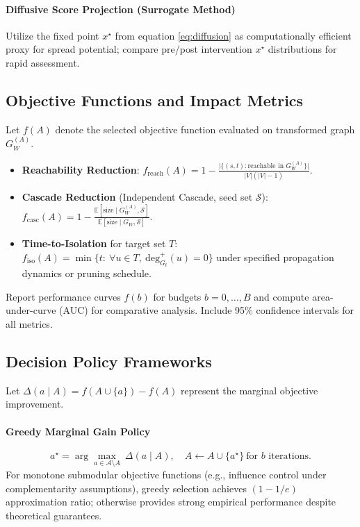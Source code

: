 \documentclass[12pt]{article}
\theoremstyle{plain}
\begin{document}
\paragraph{Diffusive Score Projection (Surrogate Method)}
Utilize the fixed point $x^\star$ from equation \eqref{eq:diffusion} as computationally efficient proxy for spread potential; compare pre/post intervention $x^\star$ distributions for rapid assessment.

\subsection{Objective Functions and Impact Metrics}
Let $f(A)$ denote the selected objective function evaluated on transformed graph $G_W^{(A)}$.
\begin{itemize}\itemsep0.2em
\item \textbf{Reachability Reduction}:
$\displaystyle f_{\text{reach}}(A)=1-\frac{\lvert\{(s,t):\text{reachable in }G_W^{(A)}\}\rvert}{\lvert V\rvert(\lvert V\rvert-1)}.$
\item \textbf{Cascade Reduction} (Independent Cascade, seed set $\mathcal{S}$):
$\displaystyle f_{\text{casc}}(A)=1-\frac{\mathbb{E}[\text{size}\mid G_W^{(A)},\mathcal{S}]}{\mathbb{E}[\text{size}\mid G_W,\mathcal{S}]}.$
\item \textbf{Time-to-Isolation} for target set $T$:
$\displaystyle f_{\text{iso}}(A)=\min\{t:\ \forall u\in T,\ \text{deg}^{+}_{G_t}(u)=0\}$ under specified propagation dynamics or pruning schedule.
\end{itemize}
Report performance curves $f(b)$ for budgets $b=0,\dots,B$ and compute area-under-curve (AUC) for comparative analysis. Include 95\% confidence intervals for all metrics.

\subsection{Decision Policy Frameworks}
Let $\Delta(a\mid A)=f(A\cup\{a\})-f(A)$ represent the marginal objective improvement.

\paragraph{Greedy Marginal Gain Policy}
\[
a^\star=\arg\max_{a\in\mathcal{A}\setminus A}\ \Delta(a\mid A),\quad A\leftarrow A\cup\{a^\star\}\ \text{for }b\text{ iterations.}
\]
For monotone submodular objective functions (e.g., influence control under complementarity assumptions), greedy selection achieves $(1-1/e)$ approximation ratio; otherwise provides strong empirical performance despite theoretical guarantees.
\end{document}
